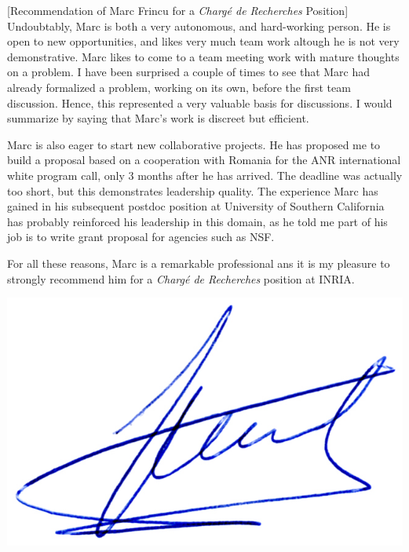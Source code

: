\documentclass[a4paper,10pt]{article}
\begin{document}
\begin{letter}[Recommendation of Marc Frincu for a \emph{Chargé de Recherches} Position]
Undoubtably, Marc  is both a  very autonomous,  and hard-working person.   He is
open to new opportunities, and likes very  much team work altough he is not very
demonstrative. Marc likes to come to a team meeting work with mature thoughts on
a problem. I have been surprised a couple  of times to see that Marc had already
formalized a  problem, working  on its  own, before  the first  team discussion.
Hence, this represented a very valuable basis for discussions. I would summarize
by saying that Marc's work is discreet but efficient.

Marc is also  eager to start new  collaborative projects. He has  proposed me to
build a proposal  based on a cooperation with Romania  for the ANR international
white  program call,  only 3  months  after he  has arrived.   The deadline  was
actually too  short, but this  demonstrates leadership quality.   The experience
Marc has  gained in his  subsequent postdoc  position at University  of Southern
California has probably reinforced his leadership  in this domain, as he told me
part of his job is to write grant proposal for agencies such as NSF.

For all these reasons,  Marc is a remarkable professional ans  it is my pleasure
to strongly recommend him for a \emph{Chargé de Recherches} position at INRIA.


\end{letter}
\begin{flushright}
\includegraphics[width=.30\textwidth]{signgenaud.jpg}
\end{flushright}
%
%
\end{document}
